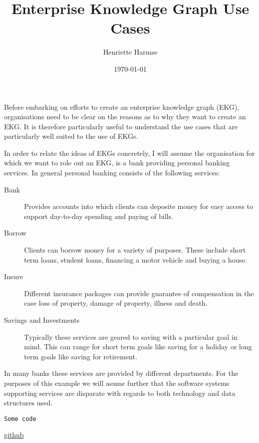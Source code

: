 \documentclass{amsart}
\title{Enterprise Knowledge Graph Use Cases}
\author{Henriette Harmse}
\date{\today}
\begin{document}
  \maketitle
  
  Before embarking on efforts to create an enterprise knowledge graph (EKG), organisations need to be clear on the reasons as to why they want to create an EKG. It is therefore particularly useful to understand the use cases that are particularly well suited to the use of EKGs. 

  In order to relate the ideas of EKGs concretely, I will assume the organisation for which we want to role out an EKG, is a bank providing personal banking services. In general personal banking consists of the following services:
  \begin{description}
  	\item[Bank] Provides accounts into which clients can deposite money for easy access to support day-to-day spending and paying of bills. 
  	\item[Borrow] Clients can borrow money for a variety of purposes. These include short term loans, student loans, financing a motor vehicle and buying a house.
  	\item[Insure] Different insurance packages can provide guarantee of compensation in the case loss of property, damage of property, illness and death.  
  	\item[Savings and Investments] Typically these services are geared to saving with a particular goal in mind. This can range for short term goals like saving for a holiday or long term goals like saving for retirement.
  \end{description}
  
   In many banks these services are provided by different departments. For the purposes of this example we will asume further that the software systems supporting services are disparate with regards to both technology and data structures used.  



  
  
  \cite{Aameri2015}

\begin{small}
\begin{verbatim} 
Some code
\end{verbatim}
\end{small}

\href{http://}{github}
  
  
  
 
\end{document}
